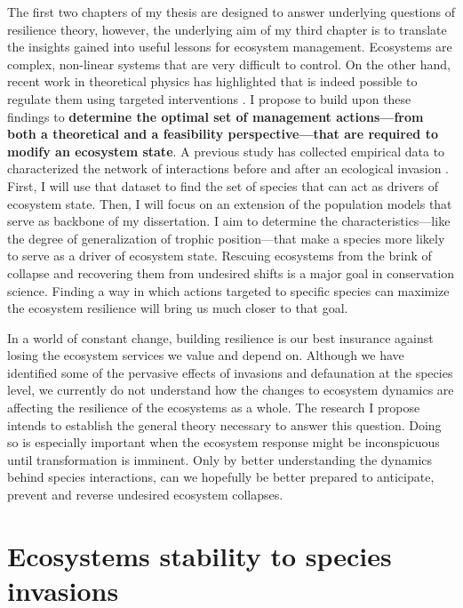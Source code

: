 \documentclass[a4paper]{article}
\begin{document}
The first two chapters of my thesis are designed to answer underlying questions of resilience theory, however, the underlying aim of my third chapter is to translate the insights gained into useful lessons for ecosystem management.
Ecosystems are complex, non-linear systems that are very difficult to control.
On the other hand, recent work in theoretical physics has highlighted that is indeed possible to regulate them using targeted interventions \autocite{Cornelius2013}.
I propose to build upon these findings to \textbf{determine the optimal set of management actions---from both a theoretical and a feasibility perspective---that are required to modify an ecosystem state}.
A previous study has collected empirical data to characterized the network of interactions before and after an ecological invasion \autocite{Bartomeus2008}.
First, I will use that dataset to find the set of species that can act as drivers of ecosystem state.
Then, I will focus on an extension of the population models that serve as backbone of my dissertation.
I aim to determine the characteristics---like the degree of generalization of trophic position---that make a species more likely to serve as a driver of ecosystem state.
Rescuing ecosystems from the brink of collapse and recovering them from undesired shifts is a major goal in conservation science.
Finding a way in which actions targeted to specific species can maximize the ecosystem resilience will bring us much closer to that goal.

In a world of constant change, building resilience is our best insurance against losing the ecosystem services we value and depend on.
Although we have identified some of the pervasive effects of invasions and defaunation at the species level, we currently do not understand how the changes to ecosystem dynamics are affecting the resilience of the ecosystems as a whole.
The research I propose intends to establish the general theory necessary to answer this question.
Doing so is especially important when the ecosystem response might be inconspicuous until transformation is imminent.
Only by better understanding the dynamics behind species interactions, can we hopefully be better prepared to anticipate, prevent and reverse undesired ecosystem collapses.









\section{Ecosystems stability to species invasions} \label{chapter1}
\end{document}
